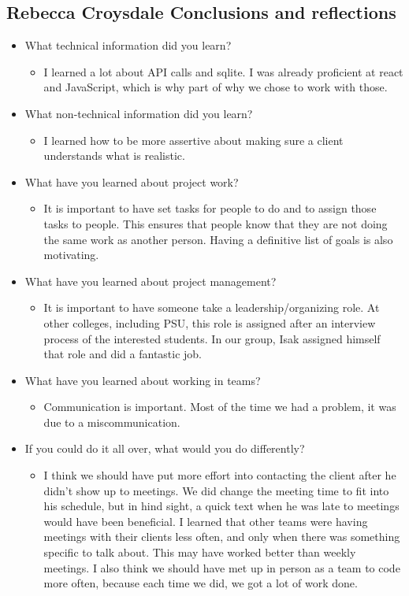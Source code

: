 \documentclass[draftclsnofoot,10pt,onecolumn]{IEEEtran}
\begin{document}
\subsection{Rebecca Croysdale Conclusions and reflections}
\begin{itemize}
    \item What technical information did you learn?
    \begin{itemize}
        \item I learned a lot about API calls and sqlite. I was already proficient at react and JavaScript, which is why part of why we chose to work with those.
    \end{itemize}
    \item What non-technical information did you learn?
    \begin{itemize}
        \item  I learned how to be more assertive about making sure a client understands what is realistic.
    \end{itemize}
    \item What have you learned about project work?
    \begin{itemize}
        \item It is important to have set tasks for people to do and to assign those tasks to people. This ensures that people know that they are not doing the same work as another person. Having a definitive list of goals is also motivating.
    \end{itemize}
    \item What have you learned about project management?
    \begin{itemize}
        \item It is important to have someone take a leadership/organizing role. At other colleges, including PSU, this role is assigned after an interview process of the interested students. In our group, Isak assigned himself that role and did a fantastic job.
    \end{itemize}
    \item What have you learned about working in teams?
    \begin{itemize}
        \item Communication is important. Most of the time we had a problem, it was due to a miscommunication.
    \end{itemize}
    \item If you could do it all over, what would you do differently?
    \begin{itemize}
        \item I think we should have put more effort into contacting the client after he didn't show up to meetings. We did change the meeting time to fit into his schedule, but in hind sight, a quick text when he was late to meetings would have been beneficial.
        I learned that other teams were having meetings with their clients less often, and only when there was something specific to talk about. This may have worked better than weekly meetings.
        I also think we should have met up in person as a team to code more often, because each time we did, we got a lot of work done.
        

\end{itemize}
\end{itemize}
\end{document}
